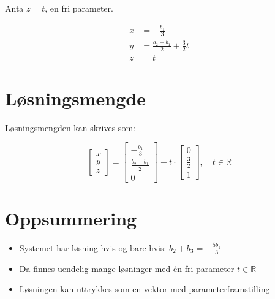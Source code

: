 \documentclass[a4paper,12pt]{article}
\begin{document}
Anta $z = t$, en fri parameter.

\begin{align*}
x &= -\frac{b_1}{3} \\
y &= \frac{b_2 + b_1}{2} + \frac{3}{2}t \\
z &= t
\end{align*}

\section*{Løsningsmengde}

Løsningsmengden kan skrives som:

\[
\begin{bmatrix}
x \\
y \\
z
\end{bmatrix}
=
\begin{bmatrix}
-\frac{b_1}{3} \\
\frac{b_2 + b_1}{2} \\
0
\end{bmatrix}
+ t \cdot
\begin{bmatrix}
0 \\
\frac{3}{2} \\
1
\end{bmatrix}, \quad t \in \mathbb{R}
\]

\section*{Oppsummering}

\begin{itemize}
    \item Systemet har løsning hvis og bare hvis: \( b_2 + b_3 = -\frac{5b_1}{3} \)
    \item Da finnes uendelig mange løsninger med én fri parameter \( t \in \mathbb{R} \)
    \item Løsningen kan uttrykkes som en vektor med parameterframstilling
\end{itemize}
\end{document}
